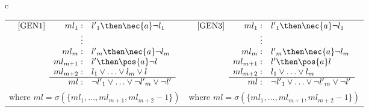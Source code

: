 \begin{table}
{\begin{tabular}{c}
{\begin{tabular}{cc}
$
\begin{array}{lrl}
    \mbox{[GEN1]} & ml_1: & {l'}_1  \then  \nec{a}\neg l_1 \\
              & \qquad \vdots  \\
              & ml_m: & {l'}_m  \then  \nec{a}\neg l_m \\
              & ml_{m+1}: & l'  \then  \pos{a}\neg  l \\
              & ml_{m+2}:  & l_1 \lor \ldots \lor l_m \lor l \\  \cline{2-3}
              & ml:  & \neg {l'}_1 \lor \ldots \lor \neg {l'}_m \lor \neg l'
\end{array} 
$
&
$
\begin{array}{lrl}
    \mbox{[GEN3]} & ml_1 : & {l'}_1 \then  \nec{a}\neg l_1 \\
             & \qquad \vdots  \\
             & ml_m : & {l'}_m  \then  \nec{a}\neg l_m \\
             & ml_{m+1} : & l'  \then \pos{a}  l \\
             & ml_{m+2} : & l_1 \lor \ldots \lor l_m  \\  \cline{2-3}
             & ml : & \neg {l'}_1 \lor \ldots \lor \neg {l'}_m \lor \neg l'
 \end{array}
 $\\

where $ml = \sigma (\{ml_1, \ldots, ml_{m+1}, ml_{m+2} - 1\})$
    &
where $ml = \sigma (\{ml_1, \ldots, ml_{m+1}, ml_{m+2} - 1\})$
\end{tabular}}\\
\\

\end{tabular}}%
\label{rules}%
\end{table}

